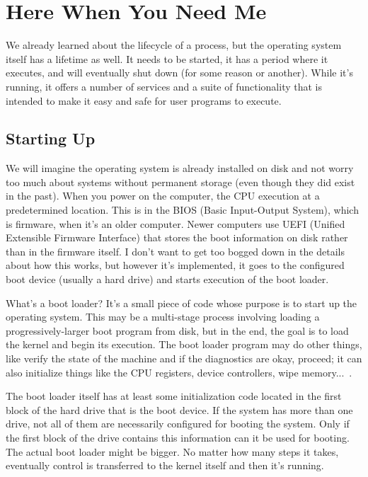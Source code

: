 




\section*{Here When You Need Me}

We already learned about the lifecycle of a process, but the operating system itself has a lifetime as well. It needs to be started, it has a period where it executes, and will eventually shut down (for some reason or another). While it's running, it offers a number of services and a suite of functionality that is intended to make it easy and safe for user programs to execute.

\subsection*{Starting Up}
We will imagine the operating system is already installed on disk and not worry too much about systems without permanent storage (even though they did exist in the past). When you power on the computer, the CPU execution at a predetermined location. This is in the BIOS (Basic Input-Output System), which is firmware, when it's an older computer. Newer computers use  UEFI (Unified Extensible Firmware Interface) that stores the boot information on disk rather than in the firmware itself. I don't want to get too bogged down in the details about how this works, but however it's implemented, it goes to the configured boot device (usually a hard drive)  and starts execution of the boot loader. 

What's a boot loader? It's a small piece of code whose purpose is to start up the operating system. This may be a multi-stage process involving loading a progressively-larger boot program from disk, but in the end, the goal is to load the kernel and begin its execution. The boot loader program may do other things, like verify the state of the machine and if the diagnostics are okay, proceed; it can also initialize things like the CPU registers, device controllers, wipe memory...~\cite{osc}.

The boot loader itself has at least some initialization code located in the first block of the hard drive that is the boot device. If the system has more than one drive, not all of them are necessarily configured for booting the system. Only if the first block of the drive contains this information can it be used for booting. The actual boot loader might be bigger. No matter how many steps it takes, eventually control is transferred to the kernel itself and then it's running. 

